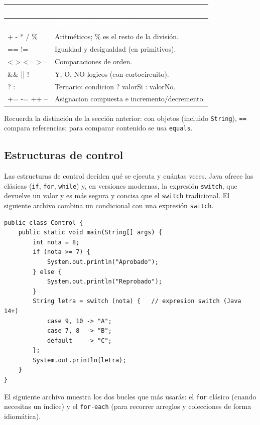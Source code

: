 \documentclass[11pt]{article}
\begin{document}
{\renewcommand{\arraystretch}{1.25}
\begin{longtable}{>{\raggedright\arraybackslash}p{2.6cm} >{\raggedright\arraybackslash}p{12.8cm}}
\rowcolor{javaazul}\textcolor{white}{\textbf{Operador}} & \textcolor{white}{\textbf{Significado y ejemplo}} \\
\endfirsthead
\rowcolor{javaazul}\textcolor{white}{\textbf{Operador}} & \textcolor{white}{\textbf{Significado y ejemplo}} \\
\endhead
\ttfamily\color{javaazul}+ - * / \% & Aritméticos; \% es el resto de la división. \\ \hline
\ttfamily\color{javaazul}== != & Igualdad y desigualdad (en primitivos). \\ \hline
\ttfamily\color{javaazul}\textless{} \textgreater{} \textless{}= \textgreater{}= & Comparaciones de orden. \\ \hline
\ttfamily\color{javaazul}\&\& || ! & Y, O, NO logicos (con cortocircuito). \\ \hline
\ttfamily\color{javaazul}? : & Ternario: condicion ? valorSi : valorNo. \\ \hline
\ttfamily\color{javaazul}+= -= ++ -- & Asignacion compuesta e incremento/decremento. \\ \hline
\end{longtable}}
Recuerda la distinción de la sección anterior: con objetos (incluido \texttt{String}), \texttt{=\allowbreak{}=\allowbreak{}} compara referencias; para comparar contenido se usa \texttt{equals}.

\subsection{Estructuras de control}
Las estructuras de control deciden qué se ejecuta y cuántas veces. Java ofrece las clásicas (\texttt{if}, \texttt{for}, \texttt{while}) y, en versiones modernas, la expresión \texttt{switch}, que devuelve un valor y es más segura y concisa que el \texttt{switch} tradicional. El siguiente archivo combina un condicional con una expresión \texttt{switch}.

\begin{cajacodigo}
\begin{lstlisting}[style=java]
public class Control {
    public static void main(String[] args) {
        int nota = 8;
        if (nota >= 7) {
            System.out.println("Aprobado");
        } else {
            System.out.println("Reprobado");
        }
        String letra = switch (nota) {   // expresion switch (Java 14+)
            case 9, 10 -> "A";
            case 7, 8  -> "B";
            default    -> "C";
        };
        System.out.println(letra);
    }
}
\end{lstlisting}
\end{cajacodigo}
\vspace{2pt}
El siguiente archivo muestra los dos bucles que más usarás: el \texttt{for} clásico (cuando necesitas un índice) y el \texttt{for-each} (para recorrer arreglos y colecciones de forma idiomática).
\end{document}
